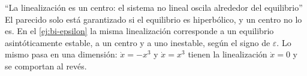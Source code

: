 \begin{trampa}[label=tr:bi-centro]{``La linealización es un centro: el sistema no lineal oscila alrededor del equilibrio''}
El parecido solo está garantizado si el equilibrio es hiperbólico, y un centro no lo es. En el \cref{ej:bi-epsilon} la misma linealización corresponde a un equilibrio asintóticamente estable, a un centro y a uno inestable, según el signo de $\varepsilon$. Lo mismo pasa en una dimensión: $\dot x=-x^3$ y $\dot x=x^3$ tienen la linealización $\dot x=0$ y se comportan al revés.
\end{trampa}
